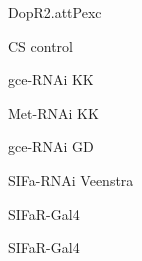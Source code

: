 \documentclass[17pt]{extarticle}
\begin{document}
\footnotesize
\vspace*{\fill}
\newpage{}
\vspace*{\fill}\begin{normalsize}
DopR2.attPexc \\[0.5em]
\end{normalsize}
\footnotesize
\vspace*{\fill}
\newpage{}
\vspace*{\fill}\begin{large}
CS control \\[0.5em]
\end{large}
\footnotesize
\vspace*{\fill}
\newpage{}
\vspace*{\fill}\begin{normalsize}
gce-RNAi KK \\[0.5em]
\end{normalsize}
\footnotesize
\vspace*{\fill}
\newpage{}
\vspace*{\fill}\begin{normalsize}
Met-RNAi KK \\[0.5em]
\end{normalsize}
\footnotesize
\vspace*{\fill}
\newpage{}
\vspace*{\fill}\begin{normalsize}
gce-RNAi GD \\[0.5em]
\end{normalsize}
\footnotesize
\vspace*{\fill}
\newpage{}
\vspace*{\fill}\begin{small}
SIFa-RNAi Veenstra \\[0.5em]
\end{small}
\footnotesize
\vspace*{\fill}
\newpage{}
\vspace*{\fill}\begin{large}
SIFaR-Gal4 \\[0.5em]
\end{large}
\footnotesize
\vspace*{\fill}
\newpage{}
\vspace*{\fill}\begin{large}
SIFaR-Gal4 \\[0.5em]
\end{large}
\footnotesize
\vspace*{\fill}
\end{document}
